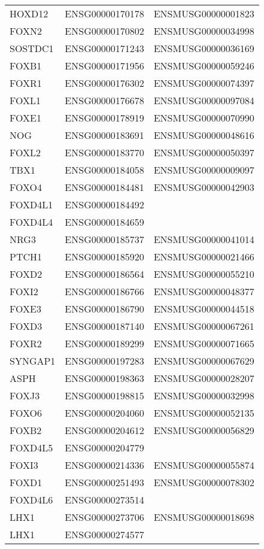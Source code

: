 \begin{longtable}{lll}
    HOXD12 & ENSG00000170178 & ENSMUSG00000001823 \\
    FOXN2 & ENSG00000170802 & ENSMUSG00000034998 \\
    SOSTDC1 & ENSG00000171243 & ENSMUSG00000036169 \\
    FOXB1 & ENSG00000171956 & ENSMUSG00000059246 \\
    FOXR1 & ENSG00000176302 & ENSMUSG00000074397 \\
    FOXL1 & ENSG00000176678 & ENSMUSG00000097084 \\
    FOXE1 & ENSG00000178919 & ENSMUSG00000070990 \\
    NOG & ENSG00000183691 & ENSMUSG00000048616 \\
    FOXL2 & ENSG00000183770 & ENSMUSG00000050397 \\
    TBX1 & ENSG00000184058 & ENSMUSG00000009097 \\
    FOXO4 & ENSG00000184481 & ENSMUSG00000042903 \\
    FOXD4L1 & ENSG00000184492 &  \\
    FOXD4L4 & ENSG00000184659 &  \\
    NRG3 & ENSG00000185737 & ENSMUSG00000041014 \\
    PTCH1 & ENSG00000185920 & ENSMUSG00000021466 \\
    FOXD2 & ENSG00000186564 & ENSMUSG00000055210 \\
    FOXI2 & ENSG00000186766 & ENSMUSG00000048377 \\
    FOXE3 & ENSG00000186790 & ENSMUSG00000044518 \\
    FOXD3 & ENSG00000187140 & ENSMUSG00000067261 \\
    FOXR2 & ENSG00000189299 & ENSMUSG00000071665 \\
    SYNGAP1 & ENSG00000197283 & ENSMUSG00000067629 \\
    ASPH & ENSG00000198363 & ENSMUSG00000028207 \\
    FOXJ3 & ENSG00000198815 & ENSMUSG00000032998 \\
    FOXO6 & ENSG00000204060 & ENSMUSG00000052135 \\
    FOXB2 & ENSG00000204612 & ENSMUSG00000056829 \\
    FOXD4L5 & ENSG00000204779 &  \\
    FOXI3 & ENSG00000214336 & ENSMUSG00000055874 \\
    FOXD1 & ENSG00000251493 & ENSMUSG00000078302 \\
    FOXD4L6 & ENSG00000273514 &  \\
    LHX1 & ENSG00000273706 & ENSMUSG00000018698 \\
    LHX1 & ENSG00000274577 &  \\
    \bottomrule
\end{longtable}
